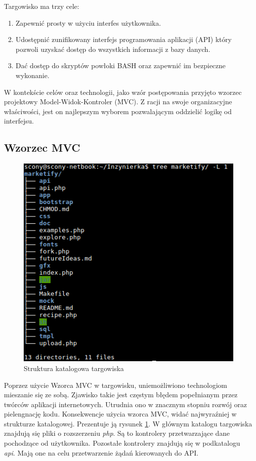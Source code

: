 \documentclass[11pt,a4paper,polish,thesis]{dcsbook}
\begin{document}
Targowisko ma trzy cele:
\begin{enumerate}
\item Zapewnić prosty w użyciu interfes użytkownika.
\item Udostępnić zunifikowany interfejs programowania aplikacji (API) który pozwoli uzyskać dostęp do wszystkich informacji z bazy danych.
\item Dać dostęp do skryptów powłoki BASH oraz zapewnić im bezpieczne wykonanie.
\end{enumerate}

W kontekście celów oraz technologii, jako wzór postępowania przyjęto wzorzec projektowy Model-Widok-Kontroler (MVC). Z racji na swoje organizacyjne właściwości, jest
on najlepszym wyborem pozwalającym oddzielić logikę od interfejsu.
\subsection{Wzorzec MVC}
\begin{figure}[H]
  \centering
  \includegraphics[scale=0.7]{./resources/market_tree.png}
  \caption{Struktura katalogowa targowiska}
  \label{fig:market_tree}
\end{figure}
Poprzez użycie Wzorca MVC w targowisku, uniemożliwiono technologiom mieszanie się ze sobą. Zjawisko takie jest częstym błędem popełnianym przez twórców aplikacji
internetowych. Utrudnia ono w znacznym stopniu rozwój oraz pielengnację kodu. Konsekwencje użycia wzorca MVC, widać najwyraźniej w strukturze katalogowej.
Prezentuje ją rysunek \ref{fig:market_tree}.
W głównym katalogu targowiska znajdują się pliki o rozszerzeniu \emph{php}. Są to kontrolery przetwarzające dane pochodzące od użytkownika. Pozostałe kontrolery
znajdują się w podkatalogu \emph{api}. Mają one na celu przetwarzenie żądań kierowanych do API.
\end{document}
